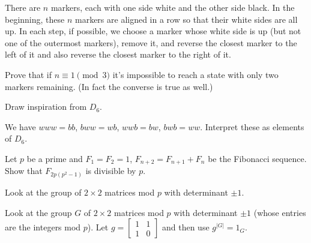 \begin{problem}
	[IMO SL 2005 C5] \twochili
	There are $n$ markers, each with one side white and the other side black.
	In the beginning, these $n$ markers are aligned in a row so that their white sides are all up.
	In each step, if possible, we choose a marker whose white side is up
	(but not one of the outermost markers),
	remove it, and reverse the closest marker to the left of it
	and also reverse the closest marker to the right of it.

	Prove that if $n \equiv 1 \pmod 3$ it's impossible to reach a state
	with only two markers remaining.
	(In fact the converse is true as well.)
	\begin{hint}
		Draw inspiration from $D_6$.
	\end{hint}
	\begin{sol}
		We have $www = bb$, $bww = wb$, $wwb = bw$, $bwb = ww$.
		Interpret these as elements of $D_6$.
	\end{sol}
\end{problem}

\begin{problem}
	\onechili
	Let $p$ be a prime and $F_1 = F_2 = 1$, $F_{n+2} = F_{n+1} + F_n$
	be the Fibonacci sequence.
	Show that $F_{2p(p^2-1)}$ is divisible by $p$.
	\begin{hint}
		Look at the group of $2 \times 2$ matrices mod $p$
		with determinant $\pm 1$.
	\end{hint}
	\begin{sol}
		Look at the group $G$ of $2 \times 2$ matrices mod $p$
		with determinant $\pm 1$ (whose entries are the integers mod $p$).
		Let $g = \begin{bmatrix} 1 & 1 \\ 1 & 0 \end{bmatrix}$
		and then use $g^{\left\lvert G \right\rvert} = 1_G$.
	\end{sol}
\end{problem}


